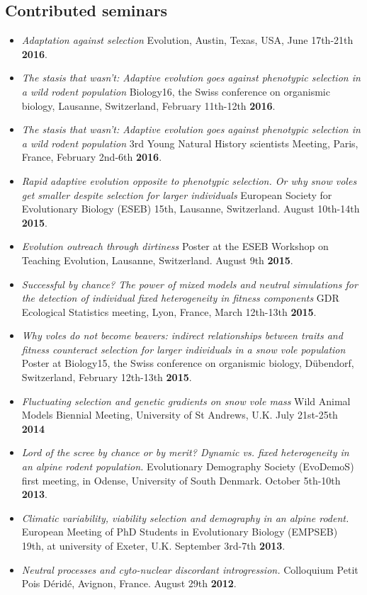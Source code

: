 \documentclass[a4paper,10pt]{article} %
\begin{document}
\subsection*{Contributed seminars}
\begin{itemize}
\item \textit{Adaptation against selection} Evolution, Austin, Texas, USA, June 17th-21th \textbf{2016}.
\item \textit{The stasis that wasn't: Adaptive evolution goes against phenotypic selection in a wild rodent population} Biology16, the Swiss conference on organismic biology, Lausanne, Switzerland, February 11th-12th \textbf{2016}.
\item \textit{The stasis that wasn't: Adaptive evolution goes against phenotypic selection in a wild rodent population} 3rd Young Natural History scientists Meeting, Paris, France, February 2nd-6th \textbf{2016}.
\item \textit{Rapid adaptive evolution opposite to phenotypic selection. Or why snow voles get smaller despite selection for larger individuals} European Society for Evolutionary Biology (ESEB) 15th, Lausanne, Switzerland. August 10th-14th \textbf{2015}.
\item \textit{Evolution outreach through dirtiness} Poster at the ESEB Workshop on Teaching Evolution, Lausanne, Switzerland. August 9th \textbf{2015}.
\item \textit{Successful by chance? The power of mixed models and neutral simulations for the detection of individual fixed heterogeneity in fitness components} GDR Ecological Statistics meeting, Lyon, France, March 12th-13th \textbf{2015}.
\item \textit{Why voles do not become beavers: indirect relationships between traits and fitness counteract selection for larger individuals in a snow vole population} Poster at Biology15, the Swiss conference on organismic biology, D\"{u}bendorf, Switzerland, February 12th-13th \textbf{2015}.
\item \textit{Fluctuating selection and genetic gradients on snow vole mass} Wild Animal Models Biennial Meeting, University of St Andrews, U.K. July 21st-25th \textbf{2014}
\item \textit{Lord of the scree by chance or by merit? Dynamic vs. fixed heterogeneity in an alpine rodent population.} Evolutionary Demography Society (EvoDemoS) first meeting, in Odense, University of South Denmark. October 5th-10th \textbf{2013}.
\item \textit{Climatic variability, viability selection and demography in an alpine rodent.} European Meeting of PhD Students in Evolutionary Biology (EMPSEB) 19th, at university of Exeter, U.K. September 3rd-7th \textbf{2013}.
\item \textit{Neutral processes and cyto-nuclear discordant introgression.} Colloquium Petit Pois D\'{e}rid\'{e}, Avignon, France. August 29th \textbf{2012}.
\end{itemize}
\end{document}
